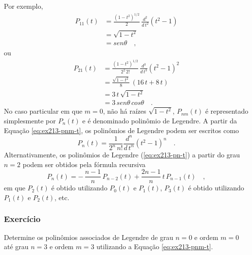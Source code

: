 \documentclass[10pt,a4paper,fleqn]{article}
\begin{document}
Por exemplo,
\begin{equation}
\begin{split}
P_{11}(t) & = \frac{(1 - t^{2})^{1/2}}{2} \, \frac{d^{2}}{d \, t^{2}}(t^{2} - 1) \\
& = \sqrt{1 - t^{2}} \\
& = sen \theta \quad ,
\end{split}
\label{eq:ex213-p11-t}
\end{equation}
ou
\begin{equation}
\begin{split}
P_{21}(t) & = \frac{(1 - t^{2})^{1/2}}{2^{2} \, 2!} \, \frac{d^{3}}{d \, t^{3}}(t^{2} - 1)^{2} \\
& = \frac{\sqrt{1 - t^{2}}}{8} \, (16 \, t + 8 \, t) \\
& = 3 \, t \, \sqrt{1 - t^{2}} \\
& = 3 \, sen \theta \, cos \theta \quad .
\end{split}
\label{eq:ex213-p21-t}
\end{equation}
No caso particular em que $m = 0$, n\~{a}o h\'{a} ra\'{i}zes $\sqrt{1 - t^{2}}$, $P_{nm}(t)$ \'{e} representado 
simplesmente por $P_{n}(t)$ e \'{e} denominado polin\^{o}mio de Legendre. A partir da Equação \ref{eq:ex213-pnm-t}, 
os polin\^{o}mios de Legendre podem ser escritos como
\begin{equation}
P_{n}(t) = \frac{1}{2^{n} \, n!} \frac{d^{n}}{d \, t^{n}}(t^{2} - 1)^{n} \quad .
\label{eq:ex213-pn-t}
\end{equation}
Alternativamente, os polin\^{o}mios de Legendre (\ref{eq:ex213-pn-t}) a partir do grau $n = 2$ podem ser obtidos pela 
f\'{o}rmula recursiva
\begin{equation}
P_{n}(t) = - \, \frac{n - 1}{n} \, P_{n-2}(t) + \frac{2n - 1}{n} \, t \, P_{n-1}(t) \quad ,
\label{eq:ex213-pn-recursiva}
\end{equation}
em que $P_{2}(t)$ \'{e} obtido utilizando $P_{0}(t)$ e $P_{1}(t)$, $P_{3}(t)$ \'{e} obtido utilizando $P_{1}(t)$ e $P_{2}(t)$, etc.

\begin{flushleft}
\dotfill
\end{flushleft}

\subsubsection{Exerc\'{i}cio}

Determine os polin\^{o}mios associados de Legendre de grau $n = 0$ e ordem $m = 0$ at\'{e} grau $n = 3$ 
e ordem $m = 3$ utilizando a Equação \ref{eq:ex213-pnm-t}.
\end{document}
